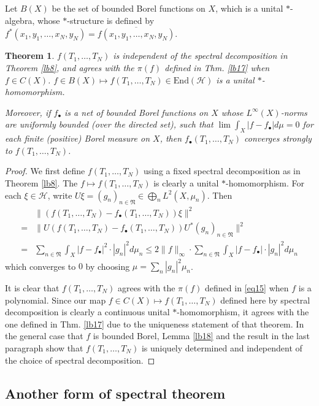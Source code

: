 \documentclass[12pt,a4paper,notitlepage]{article}
\theoremstyle{definition}
\theoremstyle{plain}
\newtheorem{thm}[df]{Theorem}
\newcommand{\fk}{\mathfrak}
\newcommand{\mc}{\mathcal}
\newcommand{\ovl}{\overline}
\newcommand{\End}{\mathrm{End}} %
\newcommand{\blt}{\bullet}
\numberwithin{equation}{section}
\begin{document}
Let $B(X)$ be the set of bounded Borel functions on $X$, which is a unital $*$-algebra, whose $*$-structure is defined by $f^*(x_1,y_1,\dots,x_N,y_N)=\ovl{f(x_1,y_1,\dots,x_N,y_N)}$.

\begin{thm}\label{lb28}
$f(T_1,\dots,T_N)$ is independent of the spectral decomposition in Theorem \ref{lb8}, and agrees with the $\pi(f)$ defined in Thm. \ref{lb17} when $f\in C(X)$. $f\in B(X)\mapsto f(T_1,\dots,T_N)\in\End(\mc H)$ is a unital $*$-homomorphism.
	
Moreover, if $f_\blt$ is a net of bounded Borel functions on $X$ whose $L^\infty(X)$-norms are uniformly bounded (over the directed set), such that $\lim \int_X|f-f_\blt|d\mu=0$ for each finite (positive) Borel measure on $X$, then $f_\blt(T_1,\dots,T_N)$ converges strongly to $f(T_1,\dots,T_N)$.
\end{thm}

\begin{proof}
We first define $f(T_1,\dots,T_N)$ using a fixed spectral decomposition as in Theorem \ref{lb8}. The $f\mapsto f(T_1,\dots,T_N)$ is clearly a unital $*$-homomorphism. For each $\xi\in\mc H$, write $U\xi=(g_n)_{n\in\fk N}\in\bigoplus_n L^2(X,\mu_n)$. Then
\begin{align*}
&\lVert (f(T_1,\dots,T_N)-f_\blt(T_1,\dots,T_N))\xi\lVert^2\\
=&	\lVert U(f(T_1,\dots,T_N)-f_\blt(T_1,\dots,T_N))U^*(g_n)_{n\in\fk N}\lVert^2\\
=&\sum_{n\in\fk N}\int_X |f-f_\blt|^2\cdot |g_n|^2d\mu_n\leq 2\lVert f\lVert_\infty \cdot \sum_{n\in\fk N}\int_X |f-f_\blt|\cdot |g_n|^2d\mu_n
\end{align*}	
which converges to $0$ by choosing $\mu=\sum_n |g_n|^2\mu_n$.

It is clear that $f(T_1,\dots,T_N)$ agrees with the $\pi(f)$ defined in \eqref{eq15} when $f$ is a polynomial. Since our map $f\in C(X)\mapsto f(T_1,\dots,T_N)$  defined here by spectral decomposition is clearly a continuous unital $*$-homomorphism,  it agrees with the one defined in Thm. \ref{lb17} due to the uniqueness statement of that theorem.  In the general case that $f$ is bounded Borel,  Lemma \ref{lb18} and the result in the last paragraph show that $f(T_1,\dots,T_N)$ is uniquely determined and independent of the choice of spectral decomposition.
\end{proof}


\subsection*{Another form of spectral theorem}
\end{document}
